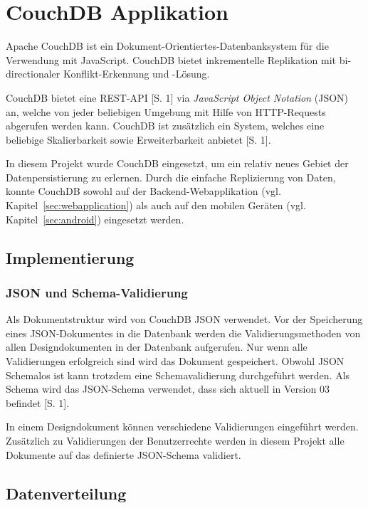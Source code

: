 \section{CouchDB Applikation}
\label{sec:couchdb}

Apache CouchDB ist ein Dokument-Orientiertes-Datenbanksystem für die Verwendung
	mit JavaScript. CouchDB bietet inkrementelle Replikation mit bi-directionaler
	Konflikt-Erkennung und -Lösung.
	
CouchDB bietet eine REST-API \cite{Fowler10}[S. 1] via \emph{JavaScript Object
	Notation} (JSON) an, welche von jeder beliebigen Umgebung mit Hilfe von
	HTTP-Requests abgerufen werden kann. CouchDB ist zusätzlich ein System, welches
	eine beliebige Skalierbarkeit sowie Erweiterbarkeit anbietet
	\cite{CouchDB11}[S. 1].
	
In diesem Projekt wurde CouchDB eingesetzt, um ein relativ neues Gebiet der
	Datenpersistierung zu erlernen. Durch die einfache Replizierung von Daten,
	konnte CouchDB sowohl auf der Backend-Webapplikation (vgl.
	Kapitel~\ref{sec:webapplication}) als auch auf den mobilen Geräten (vgl.
	Kapitel~\ref{sec:android}) eingesetzt werden.

\subsection{Implementierung}

\subsubsection{JSON und Schema-Validierung}
Als Dokumentstruktur wird von CouchDB JSON verwendet. Vor der Speicherung eines
	JSON-Dokumentes in die Datenbank werden die Validierungsmethoden von allen
	Designdokumenten in der Datenbank aufgerufen. Nur wenn alle Validierungen
	erfolgreich sind wird das Dokument gespeichert. Obwohl JSON Schemalos ist
	kann trotzdem eine Schemavalidierung durchgeführt werden. Als Schema wird
	das JSON-Schema verwendet, dass sich aktuell in Version 03
	befindet \cite{IETF11}[S. 1]. 

In einem Designdokument können verschiedene Validierungen eingeführt werden.
	Zusätzlich zu Validierungen der Benutzerrechte werden in diesem Projekt alle
	Dokumente auf das definierte JSON-Schema validiert.

\subsection{Datenverteilung}

